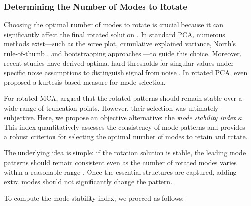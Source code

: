 \subsubsection*{Determining the Number of Modes to Rotate}\label{sec:theory:mode_stability_index}

Choosing the optimal number of modes to rotate is crucial because it can significantly affect the final rotated solution \cite[cf.][p.~271]{jolliffe_principal_2002}. In standard PCA, numerous methods exist—such as the scree plot, cumulative explained variance, North's rule-of-thumb \cite{north_sampling_1982}, and bootstrapping approaches \cite[e.g.][]{preisendorfer_principal_1988,jolliffe_principal_2002}—to guide this choice. Moreover, recent studies have derived optimal hard thresholds for singular values under specific noise assumptions to distinguish signal from noise \cite{gavish_optimal_2014,donoho_screenot_2021}. In rotated PCA, \citet{bueso_nonlinear_2020} even proposed a kurtosis-based measure for mode selection.

For rotated MCA, \citet{cheng_orthogonal_1995} argued that the rotated patterns should remain stable over a wide range of truncation points. However, their selection was ultimately subjective. Here, we propose an objective alternative: the \emph{mode stability index} $\kappa$. This index quantitatively assesses the consistency of mode patterns and provides a robust criterion for selecting the optimal number of modes to retain and rotate.

The underlying idea is simple: if the rotation solution is stable, the leading mode patterns should remain consistent even as the number of rotated modes varies within a reasonable range \cite{cheng_orthogonal_1995}. Once the essential structures are captured, adding extra modes should not significantly change the pattern.

To compute the mode stability index, we proceed as follows:

